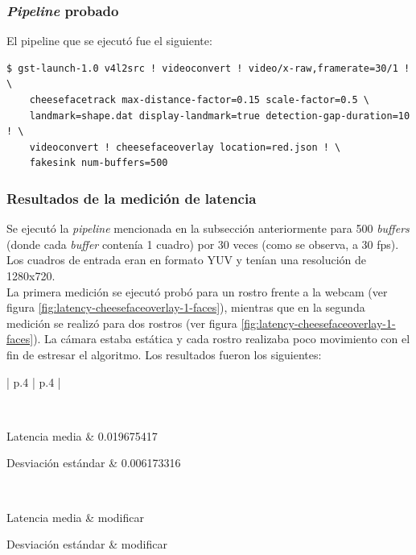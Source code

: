 \documentclass[a4paper,openright,12pt]{report}
\begin{document}
\subsubsection{\textit{Pipeline} probado}
El pipeline que se ejecutó fue el siguiente:
\begin{verbatim}
$ gst-launch-1.0 v4l2src ! videoconvert ! video/x-raw,framerate=30/1 ! \
    cheesefacetrack max-distance-factor=0.15 scale-factor=0.5 \
    landmark=shape.dat display-landmark=true detection-gap-duration=10 ! \
    videoconvert ! cheesefaceoverlay location=red.json ! \
    fakesink num-buffers=500
\end{verbatim}

\subsubsection{Resultados de la medición de latencia}
Se ejecutó la \textit{pipeline} mencionada en la subsección anteriormente para
500 \textit{buffers} (donde cada \textit{buffer} contenía 1 cuadro) por 30
veces (como se observa, a 30 fps). Los cuadros de entrada eran en formato YUV
y tenían una resolución de 1280x720.\\

La primera medición se ejecutó probó para un rostro frente a la webcam (ver
figura \ref{fig:latency-cheesefaceoverlay-1-faces}), mientras
que en la segunda medición se realizó para dos rostros (ver figura
\ref{fig:latency-cheesefaceoverlay-1-faces}). La cámara estaba estática y cada
rostro realizaba poco movimiento con el fin de estresar el algoritmo. Los
resultados fueron los siguientes:\\

  \begin{center}
    \begin{longtable}{| p{.4\textwidth} | p{.4\textwidth} |}
    \hline

    \\ \hline

    Latencia media &
    0.019675417
    \\ \hline

    Desviación estándar &
    0.006173316
    \\ \hline

    \\ \hline

    Latencia media &
    modificar
    \\ \hline

    Desviación estándar &
    modificar
    \\ \hline

    \end{longtable}
  \end{center}
\end{document}
